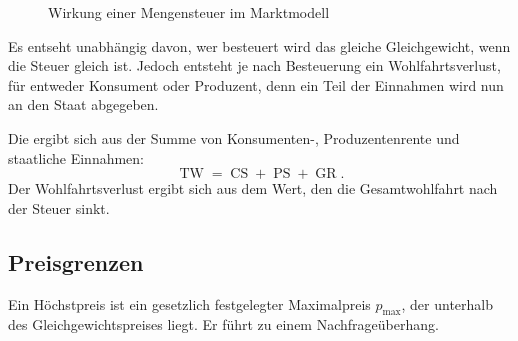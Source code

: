 \begin{figure}[h!]
\centering
{}
\caption{Wirkung einer Mengensteuer im Marktmodell}
\end{figure}

Es entseht unabhängig davon, wer besteuert wird das gleiche Gleichgewicht, wenn die Steuer gleich ist. Jedoch entsteht je nach Besteuerung ein Wohlfahrtsverlust, für entweder Konsument oder Produzent, denn ein Teil der Einnahmen wird nun an den Staat abgegeben.
\begin{definition}
    Die  ergibt sich aus der Summe von Konsumenten-, Produzentenrente und staatliche Einnahmen:
    \[
        \operatorname{TW} = \operatorname{CS} + \operatorname{PS} + \operatorname{GR}
    .\] 
    Der Wohlfahrtsverlust ergibt sich aus dem Wert, den die Gesamtwohlfahrt nach der Steuer sinkt. 
\end{definition}

\subsection{Preisgrenzen}

Ein Höchstpreis ist ein gesetzlich festgelegter Maximalpreis \( p_{\text{max}} \), der unterhalb des Gleichgewichtspreises liegt. Er führt zu einem Nachfrageüberhang.


